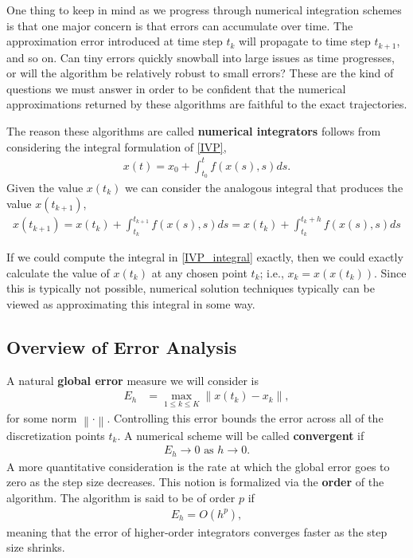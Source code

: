 \documentclass[12pt]{article}
\newcommand*{\norm}[1]{\left\lVert#1\right\rVert}
\begin{document}
One thing to keep in mind as we progress through numerical integration schemes is that one major concern is that errors can accumulate 
over time. The approximation error introduced at time step $t_k$ will propagate to time step $t_{k+1}$, and so on. Can tiny errors quickly snowball into 
large issues as time progresses, or will the algorithm be relatively robust to small errors? These are the kind of questions we must answer in 
order to be confident that the numerical approximations returned by these algorithms are faithful to the exact trajectories.

The reason these algorithms are called \textbf{numerical integrators} follows from considering the integral formulation of \ref{IVP}, 
\begin{align}
x(t) = x_0 + \int_{t_0}^{t} f(x(s), s) ds. 
\end{align}
Given the value $x(t_k)$ we can consider the analogous integral that produces the value $x(t_{k+1})$, 
\begin{align}
x(t_{k+1}) = x(t_k) + \int_{t_k}^{t_{k+1}} f(x(s), s) ds = x(t_k) + \int_{t_k}^{t_k + h} f(x(s), s) ds \label{IVP_integral}
\end{align}

If we could compute the integral in \ref{IVP_integral} exactly, then we could exactly calculate the value of $x(t_k)$ at any chosen point $t_k$; i.e., 
$x_k = x(x(t_k))$. Since this is typically not possible, numerical solution techniques typically can be viewed as approximating this integral in some way.  

\subsection{Overview of Error Analysis}
 A natural \textbf{global error} measure we will consider is 
\begin{align}
E_h &= \max_{1 \leq k \leq K} \norm{x(t_k) - x_k},
\end{align}
for some norm $\norm{\cdot}$. Controlling this error bounds the error across all of the discretization points $t_k$. A numerical scheme will be called 
\textbf{convergent} if 
\begin{align*}
E_h \to 0 \text{ as } h \to 0.
\end{align*}
A more quantitative consideration is the rate at which the global error goes to zero as the step size decreases. This notion is formalized via the 
\textbf{order} of the algorithm. The algorithm is said to be of order $p$ if 
\begin{align*}
E_h = O(h^p), 
\end{align*}
meaning that the error of higher-order integrators converges faster as the step size shrinks.  
\end{document}
